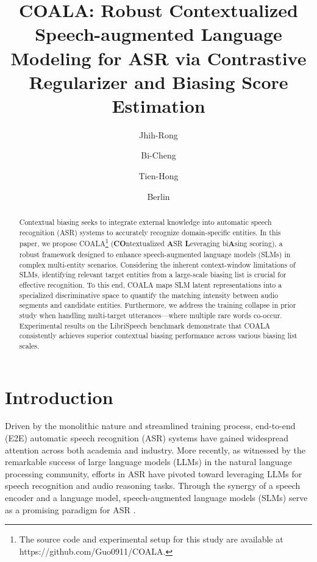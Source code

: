 \documentclass[cameraready]{Interspeech}
\title{COALA: Robust Contextualized Speech-augmented Language Modeling for ASR via Contrastive Regularizer and Biasing Score Estimation}
\author[affiliation={}]{Jhih-Rong}{Guo}
\author[affiliation={}]{Bi-Cheng}{Yan}
\author[affiliation={}]{Tien-Hong}{Lo}
\author[affiliation={}]{Berlin}{Chen}
\begin{document}
\maketitle

\begin{abstract}
    Contextual biasing seeks to integrate external knowledge into automatic speech recognition (ASR) systems to accurately recognize domain-specific entities. In this paper, we propose COALA\footnote{The source code and experimental setup for this study are available at https://github.com/Guo0911/COALA.} (\textbf{CO}ntextualized \textbf{A}SR \textbf{L}everaging bi\textbf{A}sing scoring), a robust framework designed to enhance speech-augmented language models (SLMs) in complex multi-entity scenarios. Considering the inherent context-window limitations of SLMs, identifying relevant target entities from a large-scale biasing list is crucial for effective recognition. To this end, COALA maps SLM latent representations into a specialized discriminative space to quantify the matching intensity between audio segments and candidate entities. Furthermore, we address the training collapse in prior study when handling multi-target utterances—where multiple rare words co-occur. Experimental results on the LibriSpeech benchmark demonstrate that COALA consistently achieves superior contextual biasing performance across various biasing list scales.
\end{abstract}



\section{Introduction}
Driven by the monolithic nature and streamlined training process, end-to-end (E2E) automatic speech recognition (ASR) systems \cite{graves2006connectionist, graves2012sequence, bahdanau2015neural, tang2023hybrid} have gained widespread attention across both academia and industry.
%
More recently, as witnessed by the remarkable success of large language models (LLMs) in the natural language processing community, efforts in ASR have pivoted toward leveraging LLMs for speech recognition and audio reasoning tasks.
%
Through the synergy of a speech encoder and a language model, speech-augmented language models (SLMs) serve as a promising paradigm for ASR \cite{chu2023qwen, tang2023salmonn, chu2024qwen2, lam2025prepending, hu2024wavllm}.
\end{document}
